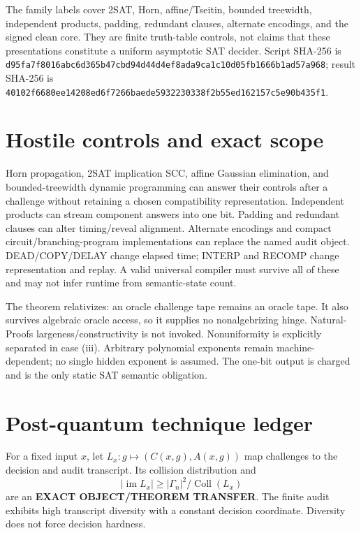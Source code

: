 \documentclass[11pt]{article}
\begin{document}
The family labels cover 2SAT, Horn, affine/Tseitin, bounded treewidth,
independent products, padding, redundant clauses, alternate encodings, and
the signed clean core.  They are finite truth-table controls, not claims that
these presentations constitute a uniform asymptotic SAT decider.  Script
SHA-256 is
\nolinkurl{d95fa7f8016abc6d365b47cbd94d44d4ef8ada9ca1c10d05fb1666b1ad57a968};
result SHA-256 is
\nolinkurl{40102f6680ee14208ed6f7266baede5932230338f2b55ed162157c5e90b435f1}.

\section{Hostile controls and exact scope}

Horn propagation, 2SAT implication SCC, affine Gaussian elimination, and
bounded-treewidth dynamic programming can answer their controls after a
challenge without retaining a chosen compatibility representation.
Independent products can stream component answers into one bit.  Padding and
redundant clauses can alter timing/reveal alignment.  Alternate encodings and
compact circuit/branching-program implementations can replace the named audit
object.  DEAD/COPY/DELAY change elapsed time; INTERP and RECOMP change
representation and replay.  A valid universal compiler must survive all of
these and may not infer runtime from semantic-state count.

The theorem relativizes: an oracle challenge tape remains an oracle tape.  It
also survives algebraic oracle access, so it supplies no nonalgebrizing hinge.
Natural-Proofs largeness/constructivity is not invoked.  Nonuniformity is
explicitly separated in case (iii).  Arbitrary polynomial exponents remain
machine-dependent; no single hidden exponent is assumed.  The one-bit output
is charged and is the only static SAT semantic obligation.

\section{Post-quantum technique ledger}

For a fixed input $x$, let $L_x:g\mapsto(C(x,g),A(x,g))$ map challenges to
the decision and audit transcript.  Its collision distribution and
\[
 |\operatorname{im}L_x|\ge
 |\Gamma_n|^2/\operatorname{Coll}(L_x)                         \tag{6}
\]
are an \textbf{EXACT OBJECT/THEOREM TRANSFER}.  The finite audit exhibits
high transcript diversity with a constant decision coordinate.  Diversity
does not force decision hardness.
\end{document}
